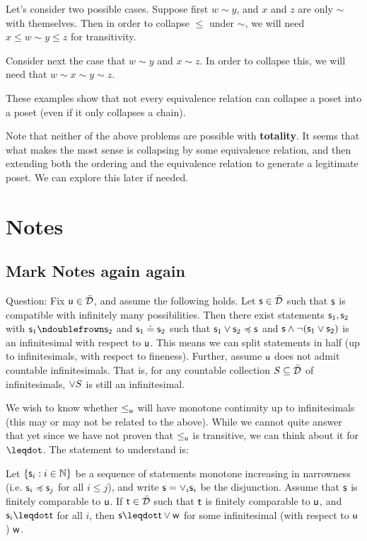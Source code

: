 \documentclass[10pt, onecolumn, nofootinbib]{revtex4-2}
\begin{document}
Let's consider two possible cases. Suppose first $w\sim y$, and $x$ and $z$ are only $\sim$ with themselves. Then in order to collapse $\leq$ under $\sim$, we will need $x \leq w\sim y \leq z$ for transitivity. 

Consider next the case that $w\sim y$ and $x\sim z$. In order to collapse this, we will need that $w\sim x\sim y \sim z$.

These examples show that not every equivalence relation can collapse a poset into a poset (even if it only collapses a chain). 

Note that neither of the above problems are possible with {\bf totality}. It seems that what makes the most sense is collapsing by some equivalence relation, and then extending both the ordering and the equivalence relation to generate a legitimate poset. We can explore this later if needed. 

\section{Notes}

\subsection{Mark Notes again again}

Question: Fix $\stmt[u]\in\tdomain$, and assume the following holds. Let $\stmt\in\tdomain$ such that $\stmt$ is compatible with infinitely many possibilities. Then there exist statements $\stmt_1,\stmt_2$ with $\stmt_1\ncomp\stmt_2$ and $\stmt_1\eqgran\stmt_2$ such that $\stmt_1\OR\stmt_2\narrower\stmt$ and $\stmt\AND\NOT(\stmt_1\OR\stmt_2)$ is an infinitesimal with respect to $\stmt[u]$. This means we can split statements in half (up to infinitesimals, with respect to fineness). 
Further, assume $\stmt[u]$ does not admit countable infinitesimals. That is, for any countable collection $S\subseteq\tdomain$ of infinitesimals, $\OR S$ is still an infinitesimal. 

We wish to know whether $\leq_{\stmt[u]}$ will have monotone continuity up to infinitesimals (this may or may not be related to the above). While we cannot quite answer that yet since we have not proven that $\lequ$ is transitive, we can think about it for $\finer$. The statement to understand is: 

Let $\{\stmt_i:i\in\mathbb{N}\}$ be a sequence of statements monotone increasing in narrowness (i.e. $\stmt_i\narrower\stmt_j$ for all $i\leq j$), and write $\stmt=\OR_i\stmt_i$ be the disjunction. Assume that $\stmt$ is finitely comparable to $\stmt[u]$. If $\stmt[t]\in\tdomain$ such that $\stmt[t]$ is finitely comparable to $\stmt[u]$, and $\stmt_i\finer\stmt[t]$ for all $i$, then $\stmt\finer\stmt[t]\OR\stmt[w]$ for some infinitesimal (with respect to $\stmt[u]$) $\stmt[w]$. 
\end{document}
